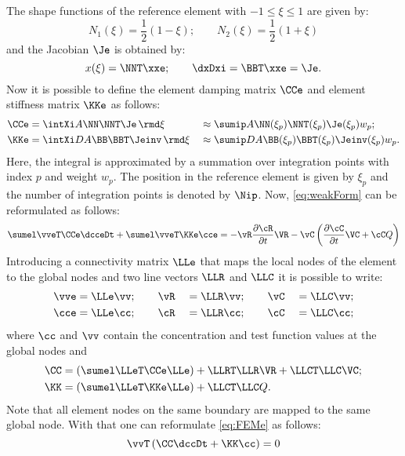   The shape functions of the reference element with $-1\le\xi\le 1$ are given by:
  \begin{equation}
    N_1(\xi) = \frac{1}{2}(1-\xi); \qquad N_2(\xi) = \frac{1}{2}(1+\xi)
  \end{equation}
  and the Jacobian $\Je$ is obtained by:
  \begin{equation}
    x(\xi) = \NNT\xxe ; \qquad \dxDxi = \BBT \xxe = \Je.
  \end{equation}
  Now it is possible to define the element damping matrix $\CCe$ and element stiffness matrix $\KKe$ as follows:
  \begin{alignat}{2}
    \CCe &= \intXi A \NN \NNT \Je \,\rmd\xi&&\approx \sumip A \NN(\xi_p) \NNT(\xi_p) \Je(\xi_p) w_p; \label{eq:CCe}\\
    \KKe &= \intXi D A \BB \BBT \Jeinv \,\rmd\xi&&\approx \sumip D A \BB(\xi_p) \BBT(\xi_p) \Jeinv(\xi_p) w_p. \label{eq:KKe}
  \end{alignat}
  Here, the integral is approximated by a summation over integration points with index $p$ and weight $w_p$. The position in the reference element is given by $\xi_p$ and the number of integration points is denoted by $\Nip$. Now, \cref{eq:weakForm} can be reformulated as follows:
  \begin{equation}
     \sumel \vveT \CCe \dcceDt + \sumel \vveT \KKe \cce = - \vR \frac{\partial \cR}{\partial t} \VR - \vC \left( \frac{\partial \cC}{\partial t} \VC + \cC Q\right)
     \label{eq:FEMe}
  \end{equation}
  Introducing a connectivity matrix $\LLe$ that maps the local nodes of the element to the global nodes and two line vectors $\LLR$ and $\LLC$ it is possible to write:
  \begin{alignat}{3}
    \vve &= \LLe \vv; \qquad \vR &&= \LLR \vv; \qquad \vC &&= \LLC \vv; \\
    \cce &= \LLe \cc; \qquad \cR &&= \LLR \cc; \qquad \cC &&= \LLC \cc;
  \end{alignat}
  where $\cc$ and $\vv$ contain the concentration and test function values at the global nodes and
  \begin{align}
    \CC &= \left(\sumel \LLeT \CCe \LLe\right) + \LLRT\LLR\VR + \LLCT\LLC\VC; \\
    \KK &= \left(\sumel \LLeT \KKe \LLe\right) + \LLCT\LLC Q.
  \end{align}
  Note that all element nodes on the same boundary are mapped to the same global node. With that one can reformulate \cref{eq:FEMe} as follows:
  \begin{equation}
    \vvT \left(\CC \dccDt + \KK \cc \right) = 0 \label{eq:FEM}
  \end{equation}
